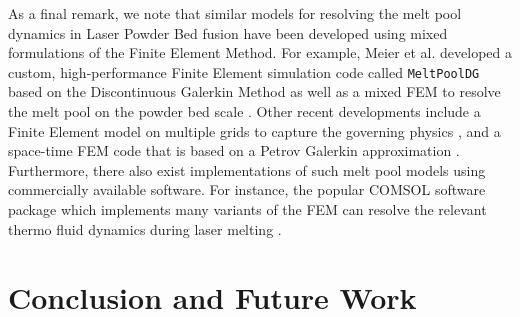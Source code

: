 \documentclass[asi,article,submit,moreauthors]{Definitions/mdpi}
\begin{document}
As a final remark, we note that similar models for resolving the melt pool dynamics in Laser Powder Bed fusion have been developed using mixed formulations of the Finite Element Method.
For example, Meier et al. developed a custom, high-performance Finite Element simulation code called \texttt{MeltPoolDG} based on the Discontinuous Galerkin Method as well as a mixed FEM to resolve the melt pool on the powder bed scale \cite{meierPhysicsBasedModelingPredictive2021,kronbichlerFastMassivelyParallel2018}.
Other recent developments include a Finite Element model on multiple grids to capture the governing physics \cite{caboussatNumericalSimulationTemperaturedriven2023}, and a space-time FEM code that is based on a Petrov Galerkin approximation \cite{koppSpacetimeHpfiniteElements2022}.
Furthermore, there also exist implementations of such melt pool models using commercially available software.
For instance, the popular COMSOL software package which implements many variants of the FEM can resolve the relevant thermo fluid dynamics during laser melting \cite{liuSimulationPowderPacking2020,mayiTransientDynamicsStability2021}.

\section{Conclusion and Future Work}
\end{document}
